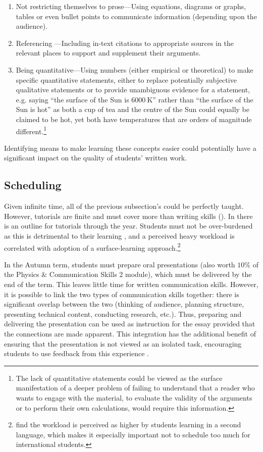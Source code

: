 \begin{enumerate}
\item Not restricting themselves to prose---Using equations, diagrams or graphs, tables or even bullet points to communicate information (depending upon the audience).
\item Referencing \citep{Warner2011}---Including in-text citations to appropriate sources in the relevant places to support and supplement their arguments.
\item Being quantitative---Using numbers (either empirical or theoretical) to make specific quantitative statements, either to replace potentially subjective qualitative statements or to provide unambiguous evidence for a statement, e.g. saying ``the surface of the Sun is $6000~\mathrm{K}$'' rather than ``the surface of the Sun is hot'' as both a cup of tea and the centre of the Sun could equally be claimed to be hot, yet both have temperatures that are orders of magnitude different.\footnote{The lack of quantitative statements could be viewed as the surface manifestation of a deeper problem of failing to understand that a reader who wants to engage with the material, to evaluate the validity of the arguments or to perform their own calculations, would require this information.}
\end{enumerate}
Identifying means to make learning these concepts easier could potentially have a significant impact on the quality of students' written work.

\subsection{Scheduling}\label{sec:timetable}

Given infinite time, all of the previous subsection's could be perfectly taught. However, tutorials are finite and must cover more than writing skills (). In  there is an outline for tutorials through the year. Students must not be over-burdened as this is detrimental to their learning \citep[chapter 8]{Ramsden1992}, and a perceived heavy workload is correlated with adoption of a surface-learning approach\citep[and references therein]{Kember1998}.\footnote{\citet{Kember1998} find the workload is perceived as higher by students learning in a second language, which makes it especially important not to schedule too much for international students.}

In the Autumn term, students must prepare oral presentations (also worth $10\%$ of the Physics \& Communication Skills 2 module), which must be delivered by the end of the term. This leaves little time for written communication skills. However, it is possible to link the two types of communication skills together: there is significant overlap between the two (thinking of audience, planning structure, presenting technical content, conducting research, etc.). Thus, preparing and delivering the presentation can be used as instruction for the essay provided that the connections are made apparent. This integration has the additional benefit of ensuring that the presentation is not viewed as an isolated task, encouraging students to use feedback from this experience \citep{Housell2003}.

